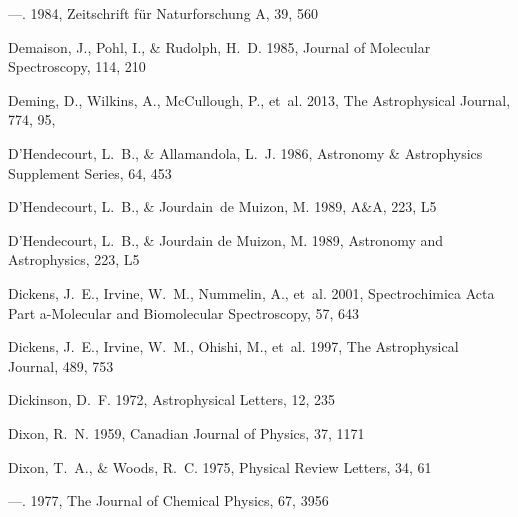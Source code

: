 \documentclass[twocolumn]{aastex631}
\begin{document}
\begin{thebibliography}{}
---. 1984, Zeitschrift f{\"u}r Naturforschung A, 39, 560

Demaison, J., Pohl, I., \& Rudolph, H.~D. 1985, Journal of Molecular
  Spectroscopy, 114, 210

{Deming}, D., {Wilkins}, A., {McCullough}, P., {et~al.} 2013, The Astrophysical
  Journal, 774, 95, 

D'Hendecourt, L.~B., \& Allamandola, L.~J. 1986, Astronomy {\&} Astrophysics
  Supplement Series, 64, 453

D'Hendecourt, L.~B., \& Jourdain~de Muizon, M. 1989, A{\&}A, 223, L5

{D'Hendecourt}, L.~B., \& {Jourdain de Muizon}, M. 1989, Astronomy and
  Astrophysics, 223, L5

Dickens, J.~E., Irvine, W.~M., Nummelin, A., {et~al.} 2001, Spectrochimica Acta
  Part a-Molecular and Biomolecular Spectroscopy, 57, 643

Dickens, J.~E., Irvine, W.~M., Ohishi, M., {et~al.} 1997, The Astrophysical
  Journal, 489, 753

Dickinson, D.~F. 1972, Astrophysical Letters, 12, 235

Dixon, R.~N. 1959, Canadian Journal of Physics, 37, 1171

Dixon, T.~A., \& Woods, R.~C. 1975, Physical Review Letters, 34, 61

---. 1977, The Journal of Chemical Physics, 67, 3956


\end{thebibliography}
\end{document}
